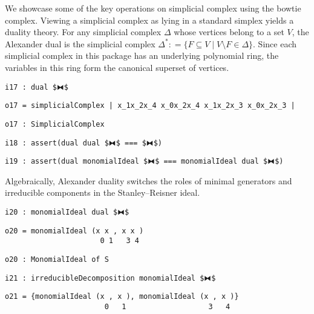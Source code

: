 \documentclass[12pt,leqno]{amsart}
\theoremstyle{definition}
\newcommand{\colequal}{\ensuremath{:\!=}}
\begin{document}
We showcase some of the key operations on simplicial complex using the bowtie
complex.  Viewing a simplicial complex as lying in a standard simplex yields a
duality theory. For any simplicial complex $\Delta$ whose vertices belong to a
set $V$, the Alexander dual is the simplicial complex
$\Delta^* \colequal \{ F \subseteq V \mathrel{|} V \setminus F \in \Delta \}$.
Since each simplicial complex in this package has an underlying polynomial
ring, the variables in this ring form the canonical superset of vertices.
\begin{lstlisting}[xleftmargin=10pt, aboveskip=3.0pt, belowskip=1.5pt]
i17 : dual $⧓$
\end{lstlisting}
\begin{lstlisting}[xleftmargin=10pt, aboveskip=1.5pt, belowskip=1.5pt]
o17 = simplicialComplex | x_1x_2x_4 x_0x_2x_4 x_1x_2x_3 x_0x_2x_3 |
\end{lstlisting}
\begin{lstlisting}[xleftmargin=10pt, aboveskip=1.5pt, belowskip=1.5pt]
o17 : SimplicialComplex
\end{lstlisting}
\begin{lstlisting}[xleftmargin=10pt, aboveskip=1.5pt, belowskip=1.5pt]
i18 : assert(dual dual $⧓$ === $⧓$)
\end{lstlisting}
\begin{lstlisting}[xleftmargin=10pt, aboveskip=1.5pt, belowskip=3pt]
i19 : assert(dual monomialIdeal $⧓$ === monomialIdeal dual $⧓$)
\end{lstlisting}
Algebraically, Alexander duality switches the roles of minimal generators and
irreducible components in the Stanley--Reisner ideal.
\begin{lstlisting}[xleftmargin=10pt, aboveskip=3pt, belowskip=1.5pt]
i20 : monomialIdeal dual $⧓$
\end{lstlisting}
\begin{lstlisting}[xleftmargin=10pt, lineskip=-10pt, aboveskip=4pt, belowskip=1pt]
o20 = monomialIdeal (x x , x x )
                      0 1   3 4
\end{lstlisting}
\begin{lstlisting}[xleftmargin=10pt, aboveskip=1.5pt, belowskip=1.5pt]
o20 : MonomialIdeal of S
\end{lstlisting}
\begin{lstlisting}[xleftmargin=10pt, aboveskip=1.5pt, belowskip=1.5pt]
i21 : irreducibleDecomposition monomialIdeal $⧓$
\end{lstlisting}
\begin{lstlisting}[xleftmargin=10pt, lineskip=-10pt, aboveskip=4pt, belowskip=1pt]
o21 = {monomialIdeal (x , x ), monomialIdeal (x , x )}
                       0   1                   3   4
\end{lstlisting}
\end{document}
